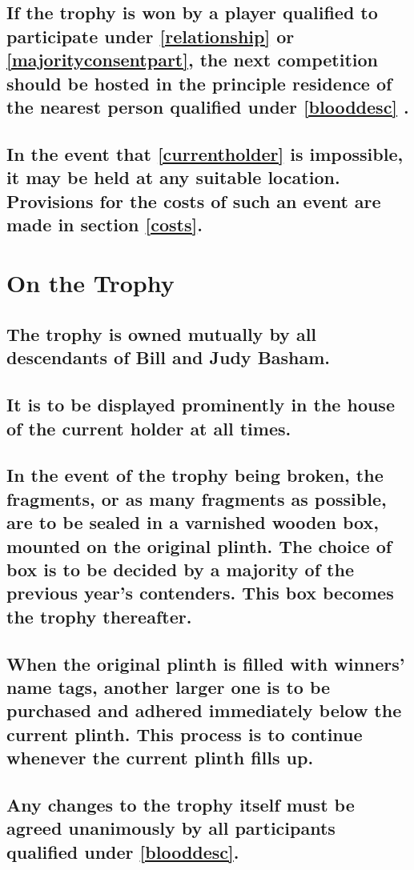 \documentclass[a4paper]{article}
\begin{document}
\subsection{If the trophy is won by a player qualified to participate under \ref{relationship} or \ref{majorityconsentpart}, the next competition should be hosted in the principle residence of the nearest person qualified under \ref{blooddesc} .}
\subsection{In the event that \ref{currentholder} is impossible,  it may be held at any suitable location. Provisions for the costs of such an event are made in section  \ref{costs}.}

\newpage

\section{On the Trophy}
\subsection{The trophy is owned mutually by all descendants of Bill and Judy Basham.}
\subsection{It is to be displayed prominently in the house of the current holder at all times.}
\subsection{In the event of the trophy being broken, the fragments, or as many fragments as possible, are to be sealed in a varnished wooden box, mounted on the original plinth. The choice of box is to be decided by a majority of the previous year’s contenders. This box becomes the trophy thereafter.}
\subsection{When the original plinth is filled with winners’ name tags, another larger one is to be purchased and adhered immediately below the current plinth. This process is to continue whenever the current plinth fills up.}
\subsection{Any changes to the trophy itself must be agreed unanimously by all participants qualified under \ref{blooddesc}.}
\end{document}
